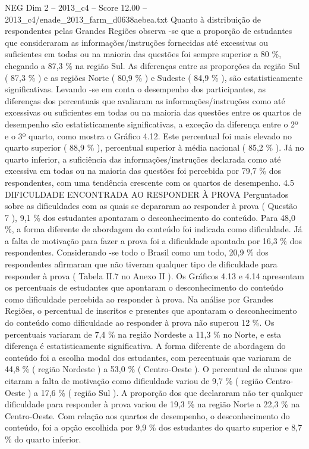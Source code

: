 \begin{textsample}{NEG Dim 2 – 2013\_c4 – Score 12.00 – 2013\_c4/enade\_2013\_farm\_d0638aebea.txt}
Quanto à distribuição de respondentes pelas Grandes Regiões observa -se que a proporção de estudantes que consideraram as informações/instruções fornecidas até excessivas ou suficientes em todas ou na maioria das questões foi sempre superior a 80 \%, chegando a 87,3 \% na região Sul.
As diferenças entre as proporções da região Sul ( 87,3 \% ) e as regiões Norte ( 80,9 \% ) e Sudeste ( 84,9 \% ), são estatisticamente significativas.
Levando -se em conta o desempenho dos participantes, as diferenças dos percentuais que avaliaram as informações/instruções como até excessivas ou suficientes em todas ou na maioria das questões entre os quartos de desempenho são estatisticamente significativas, a exceção da diferença entre o 2º e o 3º quarto, como mostra o Gráfico 4.12.
Este percentual foi mais elevado no quarto superior ( 88,9 \% ), percentual superior à média nacional ( 85,2 \% ).
Já no quarto inferior, a suficiência das informações/instruções declarada como até excessiva em todas ou na maioria das questões foi percebida por 79,7 \% dos respondentes, com uma tendência crescente com os quartos de desempenho. 4.5 DIFICULDADE ENCONTRADA AO RESPONDER À PROVA Perguntados sobre as dificuldades com as quais se depararam ao responder à prova ( Questão 7 ), 9,1 \% dos estudantes apontaram o desconhecimento do conteúdo.
Para 48,0 \%, a forma diferente de abordagem do conteúdo foi indicada como dificuldade.
Já a falta de motivação para fazer a prova foi a dificuldade apontada por 16,3 \% dos respondentes.
Considerando -se todo o Brasil como um todo, 20,9 \% dos respondentes afirmaram que não tiveram qualquer tipo de dificuldade para responder à prova ( Tabela II.7 no Anexo II ).
Os Gráficos 4.13 e 4.14 apresentam os percentuais de estudantes que apontaram o desconhecimento do conteúdo como dificuldade percebida ao responder à prova.
Na análise por Grandes Regiões, o percentual de inscritos e presentes que apontaram o desconhecimento do conteúdo como dificuldade ao responder à prova não superou 12 \%.
Os percentuais variaram de 7,4 \% na região Nordeste a 11,3 \% no Norte, e esta diferença é estatisticamente significativa.
A forma diferente de abordagem do conteúdo foi a escolha modal dos estudantes, com percentuais que variaram de 44,8 \% ( região Nordeste ) a 53,0 \% ( Centro-Oeste ).
O percentual de alunos que citaram a falta de motivação como dificuldade variou de 9,7 \% ( região Centro-Oeste ) a 17,6 \% ( região Sul ).
A proporção dos que declararam não ter qualquer dificuldade para responder à prova variou de 19,3 \% na região Norte a 22,3 \% na Centro-Oeste.
Com relação aos quartos de desempenho, o desconhecimento do conteúdo, foi a opção escolhida por 9,9 \% dos estudantes do quarto superior e 8,7 \% do quarto inferior.

\end{textsample}
